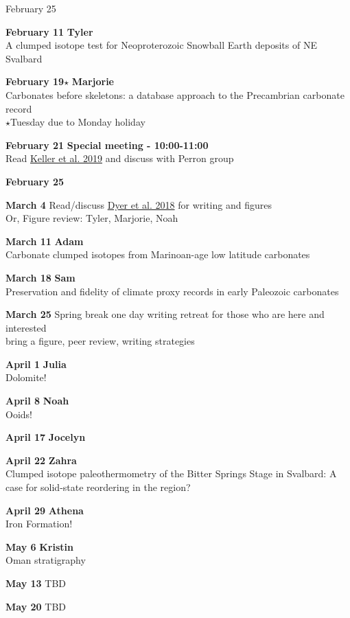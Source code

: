 \documentclass{article}
\begin{document}
\vspace{10pt}
\begin{labeling}{February 25 \hspace{1.5cm}}
\item [\textbf{February 11}] \textbf{Tyler}\\ A clumped isotope test for Neoproterozoic Snowball Earth deposits of NE Svalbard
\item [\textbf{February 19$\star$}] \textbf{Marjorie}\\Carbonates before skeletons: a database approach to the Precambrian carbonate record \\ $\star$Tuesday due to Monday holiday
\item [{\color{red}\textbf{February 21}}] {\color{red}\textbf{Special meeting - 10:00-11:00}\\ Read \href{https://brenhinkeller.github.io/files/GreatUnconformity2019.pdf}{Keller et al. 2019} and discuss with Perron group}
\item [\textbf{February 25}]
\item [\color{violet}\textbf{March 4}] {\color{violet} Read/discuss} \href{http://www.blakedyer.com/papers/Dyer2018.pdf}{Dyer et al. 2018} {\color{violet}for writing and figures}\\Or, {\color{MidnightBlue}Figure review: Tyler, Marjorie, Noah}
\item [\textbf{March 11}] \textbf{Adam}\\Carbonate clumped isotopes from Marinoan-age low latitude carbonates
\item [\textbf{March 18}] \textbf{Sam}\\Preservation and fidelity of climate proxy records in early Paleozoic carbonates
\item [\color{ForestGreen}\textbf{March 25}] {\color{ForestGreen} Spring break one day writing retreat for those who are here and interested}\\{\color{MidnightBlue} bring a figure}, peer review, {\color{BurntOrange}writing strategies}
\item [\textbf{April 1}] \textbf{Julia} \\
Dolomite!
\item [\textbf{April 8}] \textbf{Noah}\\Ooids!
\item [\textbf{April 17}] \textbf{Jocelyn}\\
\item [\textbf{April 22}] \textbf{Zahra}\\Clumped isotope paleothermometry of the Bitter Springs Stage in Svalbard: A case for solid-state reordering in the region?
\item [\textbf{April 29}] \textbf{Athena}\\Iron Formation!
\item [\textbf{May 6}] \textbf{Kristin} \\ Oman stratigraphy
\item [\color{red}\textbf{May 13}] {\color{red}TBD}
\item [\color{red}\textbf{May 20}] {\color{red}TBD}
\end{labeling}
\end{document}
